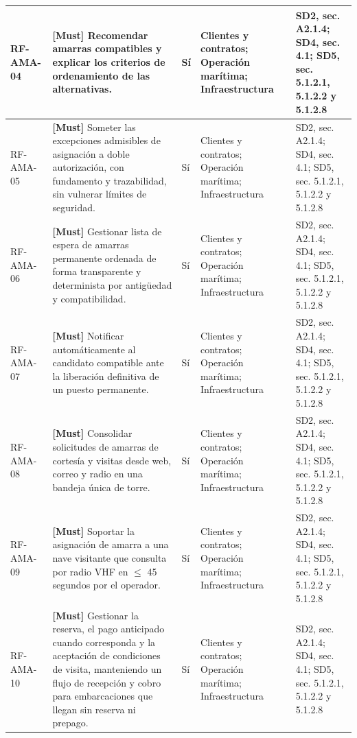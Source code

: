 \begin{paginaHorizontalSynaptix}
\begin{longtable}{|L{0.09\AnchoMatrizTDoce}|L{0.385\AnchoMatrizTDoce}|L{0.065\AnchoMatrizTDoce}|L{0.18\AnchoMatrizTDoce}|L{0.28\AnchoMatrizTDoce}|}
RF-\allowbreak{}AMA-\allowbreak{}04 &
\textbf{[Must]} Recomendar amarras compatibles y explicar los criterios de ordenamiento de las alternativas. &
Sí &
Clientes y contratos; Operación marítima; Infraestructura &
SD2, sec. A2.1.4; SD4, sec. 4.1; SD5, sec. 5.1.2.1, 5.1.2.2 y 5.1.2.8 \\ \hline

RF-\allowbreak{}AMA-\allowbreak{}05 &
\textbf{[Must]} Someter las excepciones admisibles de asignación a doble autorización, con fundamento y trazabilidad, sin vulnerar límites de seguridad. &
Sí &
Clientes y contratos; Operación marítima; Infraestructura &
SD2, sec. A2.1.4; SD4, sec. 4.1; SD5, sec. 5.1.2.1, 5.1.2.2 y 5.1.2.8 \\ \hline

RF-\allowbreak{}AMA-\allowbreak{}06 &
\textbf{[Must]} Gestionar lista de espera de amarras permanente ordenada de forma transparente y determinista por antigüedad y compatibilidad. &
Sí &
Clientes y contratos; Operación marítima; Infraestructura &
SD2, sec. A2.1.4; SD4, sec. 4.1; SD5, sec. 5.1.2.1, 5.1.2.2 y 5.1.2.8 \\ \hline

RF-\allowbreak{}AMA-\allowbreak{}07 &
\textbf{[Must]} Notificar automáticamente al candidato compatible ante la liberación definitiva de un puesto permanente. &
Sí &
Clientes y contratos; Operación marítima; Infraestructura &
SD2, sec. A2.1.4; SD4, sec. 4.1; SD5, sec. 5.1.2.1, 5.1.2.2 y 5.1.2.8 \\ \hline

RF-\allowbreak{}AMA-\allowbreak{}08 &
\textbf{[Must]} Consolidar solicitudes de amarras de cortesía y visitas desde web, correo y radio en una bandeja única de torre. &
Sí &
Clientes y contratos; Operación marítima; Infraestructura &
SD2, sec. A2.1.4; SD4, sec. 4.1; SD5, sec. 5.1.2.1, 5.1.2.2 y 5.1.2.8 \\ \hline

RF-\allowbreak{}AMA-\allowbreak{}09 &
\textbf{[Must]} Soportar la asignación de amarra a una nave visitante que consulta por radio VHF en \(\leq\) 45 segundos por el operador. &
Sí &
Clientes y contratos; Operación marítima; Infraestructura &
SD2, sec. A2.1.4; SD4, sec. 4.1; SD5, sec. 5.1.2.1, 5.1.2.2 y 5.1.2.8 \\ \hline

RF-\allowbreak{}AMA-\allowbreak{}10 &
\textbf{[Must]} Gestionar la reserva, el pago anticipado cuando corresponda y la aceptación de condiciones de visita, manteniendo un flujo de recepción y cobro para embarcaciones que llegan sin reserva ni prepago. &
Sí &
Clientes y contratos; Operación marítima; Infraestructura &
SD2, sec. A2.1.4; SD4, sec. 4.1; SD5, sec. 5.1.2.1, 5.1.2.2 y 5.1.2.8 \\ \hline


\end{longtable}
\end{paginaHorizontalSynaptix}
